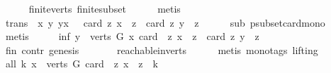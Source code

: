 \begin{isabellebody}
\ \ \ \ \isamarkupfalse%
\ finite{\isacharunderscore}{\kern0pt}verts\ finite{\isacharunderscore}{\kern0pt}subset\isanewline
\ \ \ \ \isamarkupfalse%
\ metis\ \isanewline
\ \ \isamarkupfalse%
\ \isamarkupfalse%
\ trans{\isacharcolon}{\kern0pt}\ {\isachardoublequoteopen}{\isasymforall}\ x\ y{\isachardot}{\kern0pt}\ y{\isasymrightarrow}\isactrlsup {\isacharplus}{\kern0pt}x\ {\isasymlongrightarrow}\ \ card\ {\isacharbraceleft}{\kern0pt}z{\isachardot}{\kern0pt}\ x\ {\isasymrightarrow}\isactrlsup {\isacharplus}{\kern0pt}\ z{\isacharbraceright}{\kern0pt}\ {\isacharless}{\kern0pt}\ card\ {\isacharbraceleft}{\kern0pt}z{\isachardot}{\kern0pt}\ y\ {\isasymrightarrow}\isactrlsup {\isacharplus}{\kern0pt}\ z{\isacharbraceright}{\kern0pt}{\isachardoublequoteclose}\isanewline
\ \ \ \ \isamarkupfalse%
\ sub\ psubset{\isacharunderscore}{\kern0pt}card{\isacharunderscore}{\kern0pt}mono\ \isamarkupfalse%
\ metis\isanewline
\ \ \isamarkupfalse%
\ \isamarkupfalse%
\ inf{\isacharcolon}{\kern0pt}\ {\isachardoublequoteopen}{\isasymforall}y\ {\isasymin}\ verts\ G{\isachardot}{\kern0pt}\ {\isasymexists}x{\isachardot}{\kern0pt}\ card\ \ {\isacharbraceleft}{\kern0pt}z{\isachardot}{\kern0pt}\ x\ {\isasymrightarrow}\isactrlsup {\isacharplus}{\kern0pt}\ z{\isacharbraceright}{\kern0pt}\ {\isachargreater}{\kern0pt}\ card\ {\isacharbraceleft}{\kern0pt}z{\isachardot}{\kern0pt}\ y\ {\isasymrightarrow}\isactrlsup {\isacharplus}{\kern0pt}\ z{\isacharbraceright}{\kern0pt}{\isachardoublequoteclose}\isanewline
\ \ \ \ \isamarkupfalse%
\ fin\ contr\ genesis\ \isanewline
\ \ \ \ \ \ reachable{}{\isacharunderscore}{\kern0pt}in{\isacharunderscore}{\kern0pt}verts{\isacharparenleft}{\kern0pt}{}{\isacharparenright}{\kern0pt}\isanewline
\ \ \ \ \isamarkupfalse%
\ {\isacharparenleft}{\kern0pt}metis\ {\isacharparenleft}{\kern0pt}mono{\isacharunderscore}{\kern0pt}tags{\isacharcomma}{\kern0pt}\ lifting{\isacharparenright}{\kern0pt}{\isacharparenright}{\kern0pt}\ \isanewline
\ \ \isamarkupfalse%
\ all{\isacharcolon}{\kern0pt}\ {\isachardoublequoteopen}{\isasymforall}k{\isachardot}{\kern0pt}\ {\isasymexists}x\ {\isasymin}\ verts\ G{\isachardot}{\kern0pt}\ card\ \ {\isacharbraceleft}{\kern0pt}z{\isachardot}{\kern0pt}\ x\ {\isasymrightarrow}\isactrlsup {\isacharplus}{\kern0pt}\ z{\isacharbraceright}{\kern0pt}\ {\isachargreater}{\kern0pt}\ k{\isachardoublequoteclose}\ \isanewline
\ \ \isamarkupfalse%

\end{isabellebody}
